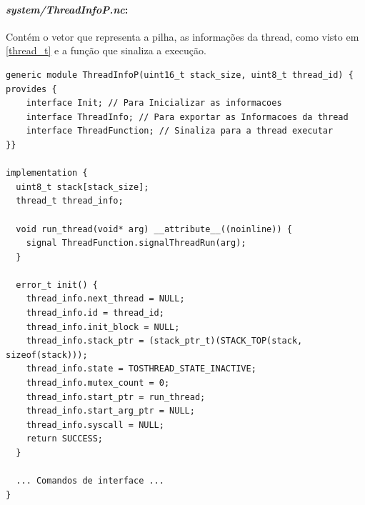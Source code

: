 \documentclass[a4paper, 10pt]{article}
\begin{document}
\paragraph{\textit{system/ThreadInfoP.nc}:}\label{ThreadInfoP} Contém o vetor que representa a pilha, as informações da thread,
como visto em \ref{thread_t} e a função que sinaliza a execução.
\begin{lstlisting}
generic module ThreadInfoP(uint16_t stack_size, uint8_t thread_id) { 
provides {
    interface Init; // Para Inicializar as informacoes
    interface ThreadInfo; // Para exportar as Informacoes da thread
    interface ThreadFunction; // Sinaliza para a thread executar 
}}

implementation {
  uint8_t stack[stack_size];
  thread_t thread_info;

  void run_thread(void* arg) __attribute__((noinline)) {
    signal ThreadFunction.signalThreadRun(arg);
  }
  
  error_t init() {
    thread_info.next_thread = NULL;
    thread_info.id = thread_id;
    thread_info.init_block = NULL;
    thread_info.stack_ptr = (stack_ptr_t)(STACK_TOP(stack, sizeof(stack)));
    thread_info.state = TOSTHREAD_STATE_INACTIVE;
    thread_info.mutex_count = 0;
    thread_info.start_ptr = run_thread;
    thread_info.start_arg_ptr = NULL;
    thread_info.syscall = NULL;
    return SUCCESS;
  }

  ... Comandos de interface ...
}
\end{lstlisting} 
\end{document}
